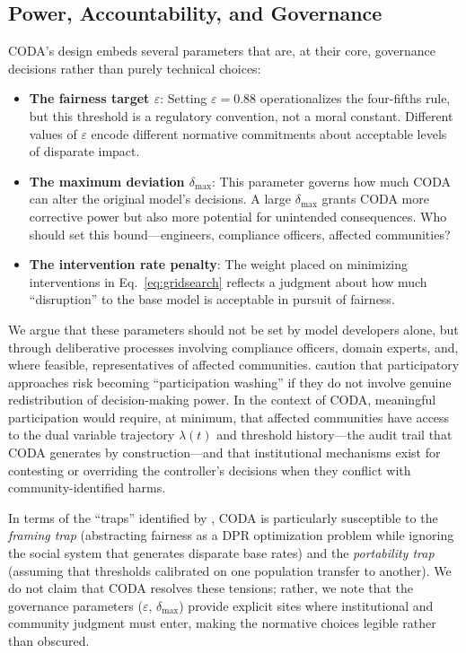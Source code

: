 \documentclass[letterpaper]{article} %
\theoremstyle{definition}
\begin{document}
\subsection{Power, Accountability, and Governance}

CODA's design embeds several parameters that are, at their core, governance decisions rather than purely technical choices:
\begin{itemize}
    \item \textbf{The fairness target $\varepsilon$}: Setting $\varepsilon = 0.88$ operationalizes the four-fifths rule, but this threshold is a regulatory convention, not a moral constant. Different values of $\varepsilon$ encode different normative commitments about acceptable levels of disparate impact.
    \item \textbf{The maximum deviation $\delta_{\max}$}: This parameter governs how much CODA can alter the original model's decisions. A large $\delta_{\max}$ grants CODA more corrective power but also more potential for unintended consequences. Who should set this bound---engineers, compliance officers, affected communities?
    \item \textbf{The intervention rate penalty}: The weight placed on minimizing interventions in Eq.~\ref{eq:gridsearch} reflects a judgment about how much ``disruption'' to the base model is acceptable in pursuit of fairness.
\end{itemize}
We argue that these parameters should not be set by model developers alone, but through deliberative processes involving compliance officers, domain experts, and, where feasible, representatives of affected communities. \citet{sloane2022participation} caution that participatory approaches risk becoming ``participation washing'' if they do not involve genuine redistribution of decision-making power. In the context of CODA, meaningful participation would require, at minimum, that affected communities have access to the dual variable trajectory $\lambda(t)$ and threshold history---the audit trail that CODA generates by construction---and that institutional mechanisms exist for contesting or overriding the controller's decisions when they conflict with community-identified harms.

In terms of the ``traps'' identified by \citet{selbst2019fairness}, CODA is particularly susceptible to the \emph{framing trap} (abstracting fairness as a DPR optimization problem while ignoring the social system that generates disparate base rates) and the \emph{portability trap} (assuming that thresholds calibrated on one population transfer to another). We do not claim that CODA resolves these tensions; rather, we note that the governance parameters ($\varepsilon$, $\delta_{\max}$) provide explicit sites where institutional and community judgment must enter, making the normative choices legible rather than obscured.
\end{document}
